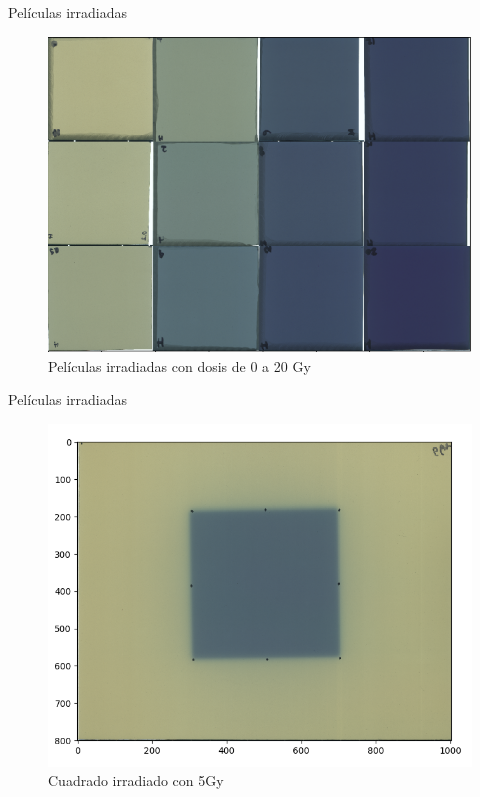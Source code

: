 \documentclass[12pt]{beamer}
\begin{document}

\begin{frame}{Películas irradiadas}
\begin{figure}
	\centering
	\includegraphics[width=0.7\linewidth]{images/peliculasIrradiadas.png}
	\caption{Películas irradiadas con dosis de 0 a 20 Gy}
\end{figure}

\end{frame}

\begin{frame}{Películas irradiadas}
\begin{figure}
	\centering
	\includegraphics[width=0.7\linewidth]{images/peliculaCuadrado.png}
	\caption{Cuadrado irradiado con 5Gy}
\end{figure}
\end{frame}
\end{document}
